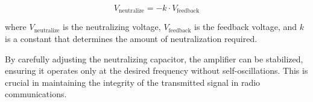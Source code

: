 \[
V_{\text{neutralize}} = -k \cdot V_{\text{feedback}}
\]

where \( V_{\text{neutralize}} \) is the neutralizing voltage, \( V_{\text{feedback}} \) is the feedback voltage, and \( k \) is a constant that determines the amount of neutralization required.

By carefully adjusting the neutralizing capacitor, the amplifier can be stabilized, ensuring it operates only at the desired frequency without self-oscillations. This is crucial in maintaining the integrity of the transmitted signal in radio communications.

